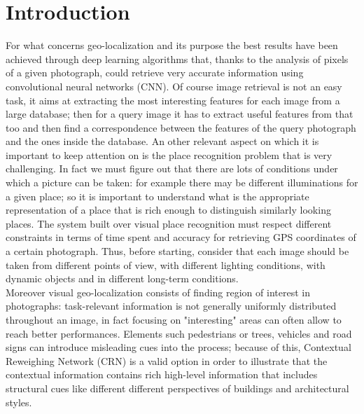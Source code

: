 \documentclass[10pt,twocolumn,letterpaper]{article}
\begin{document}
\section{Introduction}
	For what concerns geo-localization and its purpose the best results have been achieved through
	deep learning algorithms that, thanks to the analysis of pixels of a given photograph, could retrieve 
	very accurate information using convolutional neural networks (CNN). Of course image retrieval
	is not an easy task, it aims at extracting the most interesting features for each image from a large database; then for a query image
	it has to extract useful features from that too and then  find a correspondence between the features
	of the query photograph and the ones inside the database. 
	\newline An other relevant aspect on which it is important to keep attention on is the place recognition problem that
	is very challenging. In fact we must figure out that there are lots of conditions under which a picture can be taken:
	for example there may be different illuminations for a given place; so it is important to understand what is the appropriate 
	representation of a place that is rich enough to distinguish similarly looking places. The system built over
	visual place recognition must respect different constraints in terms of time spent and accuracy for retrieving GPS coordinates
	of a certain photograph. Thus, before starting, consider that each image should be taken
	from different points of view, with different lighting conditions, with dynamic objects and in different long-term conditions.\\
	Moreover visual geo-localization consists of finding region of interest in photographs: task-relevant
	information is not generally uniformly distributed throughout an image, in fact focusing on "interesting" areas
	can often allow to reach better performances. Elements such pedestrians or trees, vehicles and road signs can introduce misleading cues 
	into the process; because of this, Contextual Reweighing Network (CRN) \cite{CRN} is a valid option in order to 
	illustrate that the contextual information contains rich high-level information that includes structural cues
	like different different perspectives of buildings and architectural styles.
\end{document}

